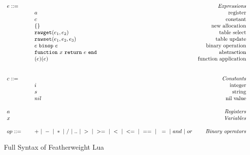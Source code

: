 \documentclass{article}
\begin{document}
\begin{figure}
\caption{Full Syntax of Featherweight Lua}
\label{fig:FW2Syx}
\[
  \begin{array}{llr}
  \mydefhead{e ::=\qquad\qquad\qquad\qquad}{Expressions}
  \mydefcase{a}{register}
  \mydefcase{c}{constant}
  \mydefcase{\{\}}{new allocation}
  \mydefcase{{\tt rawget}(e_1,e_2)}{table select}
  \mydefcase{{\tt rawset}(e_1,e_2,e_3)}{table update}
  \mydefcase{e ~{\tt binop}~ e}{binary operation}
  \mydefcase{\abFunction x e}{abstraction}
  \mydefcase{(e)(e)}{function application}
  \\
  \\
  \mydefhead{c ::=\qquad\qquad\qquad\qquad}{Constants}
  \mydefcase{i}{integer}
  \mydefcase{s}{string}
  \mydefcase{nil}{nil value}
  \\
  \mydefhead{a \qquad\qquad\qquad\qquad}{Registers}
  \mydefhead{x \qquad\qquad\qquad\qquad}{Variables}
  \\
  op ::= & + ~|~ - ~|~ * ~|~ / ~|~ .. ~|~ > ~|~ >= ~|~ < ~|~ <= ~|~ == ~|~ ~= ~|~ and ~|~ or & \mbox{\emph{Binary operators}} \\
\end{array}
\]
\end{figure}
\newcommand{\metaSemanticFull}[6]{{#1}, {#2}, {#3} \Downarrow {#4}, {#5}, {#6}}
\end{document}
